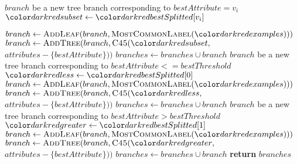     \begin{algorithm}[H]
    \begin{algorithmic} [1]

           $branch$ {\small be a new tree branch corresponding to} $bestAttribute = v_i$
          \State $\red{subset} \gets \red{bestSplitted}[v_i]$

              \State $branch \gets \textsc{AddLeaf}(branch, \textsc{MostCommonLabel}(\red{examples})))$
          \Else
              \State $branch \gets \textsc{AddTree}(branch, \textsc{C45}(\red{subset},$ $attributes - \{bestAttribute\}))$
          \EndIf
          \State $branches \gets branches \cup branch$
      \EndFor
    \Else
       $branch$ {\small be a new tree branch corresponding to} $bestAttribute <= bestThreshold$
      \State $\red{less} \gets \red{bestSplitted}[0]$
          \State $branch \gets \textsc{AddLeaf}(branch, \textsc{MostCommonLabel}(\red{examples})))$
      \Else
          \State $branch \gets \textsc{AddTree}(branch, \textsc{C45}(\red{less},$ $attributes - \{bestAttribute\}))$
      \EndIf
      \State $branches \gets branches \cup branch$
       $branch$ {\small be a new tree branch corresponding to} $bestAttribute > bestThreshold$
      \State $\red{greater} \gets \red{bestSplitted}[1]$
          \State $branch \gets \textsc{AddLeaf}(branch, \textsc{MostCommonLabel}(\red{examples})))$
      \Else
          \State $branch \gets \textsc{AddTree}(branch, \textsc{C45}(\red{greater},$ $attributes - \{bestAttribute\}))$
      \EndIf
      \State $branches \gets branches \cup branch$
    \EndIf
    \State \textbf{return} $branches$
\EndProcedure
\end{algorithmic}
\end{algorithm}

